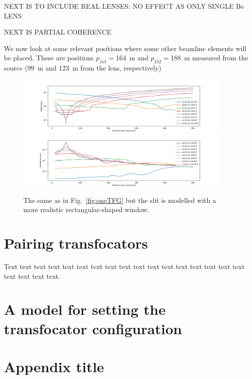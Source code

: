 \documentclass{iucr}              %
\begin{document}
NEXT IS TO INCLUDE REAL LENSES: NO EFFECT AS ONLY SINGLE Be LENS


NEXT IS PARTIAL COHERENCE


We now look at some relevant positions where some other beamline elements will be placed. These are positions $p_{fo1}=$\SI{164}{\meter} and   $p_{fo2}=$\SI{188}{\meter} measured from the source (\SI{99}{\meter} and \SI{123}{\meter} from the lens, respectively)
 
\begin{figure}
    \centering
    \includegraphics[width=0.95\textwidth]{figures/Figure_1.png}
    \includegraphics[width=0.95\textwidth]{figures/Figure_2.png}
    \caption{The same as in Fig.~\ref{fig:oneTFG} but the slit is modelled with a more realistic rectangular-shaped window.}
    \label{fig:oneTF}
\end{figure}

\section{Pairing transfocators}

Text text text text text text text text text text text text text text
text text text text text text text.

\section{A model for setting the transfocator configuration}


\appendix
\section{Appendix title}
\end{document}
